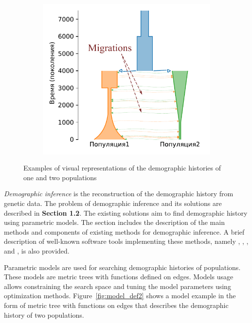 \begin{figure}[b]
\begin{subfigure}[b]{.33\textwidth}
    \caption{}
    \end{subfigure}%
    \begin{subfigure}[b]{.33\textwidth}
    \includegraphics[width=\textwidth]{images/part1/dem_history/2d_model_migration_fixed_en.pdf}
    \caption{}
    \end{subfigure}
    \caption{Examples of visual representations of the demographic histories of one and two populations}
\end{figure}



\textit{Demographic inference} is the reconstruction of the demographic history from genetic data.
The problem of demographic inference and its solutions are described in \textbf{Section 1.2}.
The existing solutions aim to find demographic history using parametric models.
The section includes the description of the main methods and components of existing methods for demographic inference.
A brief description of well-known software tools implementing these methods, namely \dadi, \moments, \momi, and \momentsLD, is also provided.

Parametric models are used for searching demographic histories of populations.
These models are metric trees with functions defined on edges.
Models usage allows constraining the search space and tuning the model parameters using optimization methods.
Figure~\ref{fig:model_def2} shows a model example in the form of metric tree with functions on edges that describes the demographic history of two populations.

